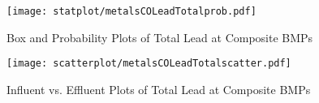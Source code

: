         \begin{figure}[hb]   %
            \centering
            \texttt{[image: statplot/metalsCOLeadTotalprob.pdf]}
            \caption{Box and Probability Plots of Total Lead at Composite BMPs}
        \end{figure}         %
        
        
        \begin{figure}[hb]   %
            \centering
            \texttt{[image: scatterplot/metalsCOLeadTotalscatter.pdf]}
            \caption{Influent vs. Effluent Plots of Total Lead at Composite BMPs}
        \end{figure}         %
        \clearpage
        